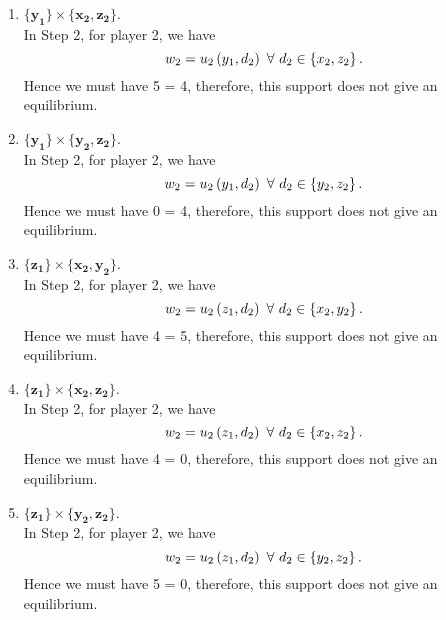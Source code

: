 \begin{enumerate} [label=\Alph*. ]
\begin{enumerate} [label*= (\arabic*)]
    \item $\mathbf{\{y_1\}} \times \mathbf{\{x_2, z_2\}}$. \\
        In Step 2, for player 2, we have
        \begin{equation*}
            w_2 = u_2 \left(y_1, d_2\right) \ \forall \ d_2 \in \left\{x_2, z_2\right\}.
        \end{equation*}
        Hence we must have 5 = 4, therefore, this support does not give an equilibrium.
        
    \item $\mathbf{\{y_1\}} \times \mathbf{\{y_2, z_2\}}$. \\
        In Step 2, for player 2, we have
        \begin{equation*}
            w_2 = u_2 \left(y_1, d_2\right) \ \forall \ d_2 \in \left\{y_2, z_2\right\}.
        \end{equation*}
        Hence we must have 0 = 4, therefore, this support does not give an equilibrium.
        
    \item $\mathbf{\{z_1\}} \times \mathbf{\{x_2, y_2\}}$. \\
        In Step 2, for player 2, we have
        \begin{equation*}
            w_2 = u_2 \left(z_1, d_2\right) \ \forall \ d_2 \in \left\{x_2, y_2\right\}.
        \end{equation*}
        Hence we must have 4 = 5, therefore, this support does not give an equilibrium.
        
    \item $\mathbf{\{z_1\}} \times \mathbf{\{x_2, z_2\}}$. \\
        In Step 2, for player 2, we have
        \begin{equation*}
            w_2 = u_2 \left(z_1, d_2\right) \ \forall \ d_2 \in \left\{x_2, z_2\right\}.
        \end{equation*}
        Hence we must have 4 = 0, therefore, this support does not give an equilibrium.
        
    \item $\mathbf{\{z_1\}} \times \mathbf{\{y_2, z_2\}}$. \\
        In Step 2, for player 2, we have
        \begin{equation*}
            w_2 = u_2 \left(z_1, d_2\right) \ \forall \ d_2 \in \left\{y_2, z_2\right\}.
        \end{equation*}
        Hence we must have 5 = 0, therefore, this support does not give an equilibrium.
\end{enumerate}




\end{enumerate}
